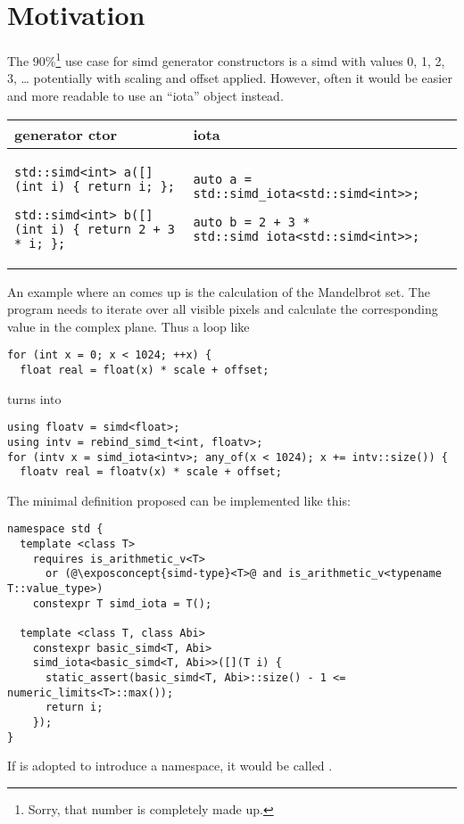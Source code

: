 \section{Motivation}
The 90\%\footnote{Sorry, that number is completely made up.} use case for simd
generator constructors is a simd with values 0, 1, 2, 3, \ldots{} potentially
with scaling and offset applied.
However, often it would be easier and more readable to use an “iota”
 object instead.

\begingroup
  \smaller[1]
\begin{tabular}{p{}|p{}}
  generator ctor & iota \\
  \hline
  \begin{lstlisting}
std::simd<int> a([](int i) { return i; };

std::simd<int> b([](int i) { return 2 + 3 * i; };
  \end{lstlisting}
  &
  \begin{lstlisting}
auto a = std::simd_iota<std::simd<int>>;

auto b = 2 + 3 * std::simd_iota<std::simd<int>>;
  \end{lstlisting}
\end{tabular}
\endgroup

\pagebreak
An example where an  comes up is the calculation of the
Mandelbrot set.
The program needs to iterate over all visible pixels and calculate the
corresponding value in the complex plane.
Thus a loop like
\medskip\begin{lstlisting}[style=Vc]
for (int x = 0; x < 1024; ++x) {
  float real = float(x) * scale + offset;
\end{lstlisting}
turns into
\medskip\begin{lstlisting}[style=Vc]
using floatv = simd<float>;
using intv = rebind_simd_t<int, floatv>;
for (intv x = simd_iota<intv>; any_of(x < 1024); x += intv::size()) {
  floatv real = floatv(x) * scale + offset;
\end{lstlisting}

The minimal definition proposed can be implemented like this:
\medskip\begin{lstlisting}[style=Vc]
namespace std {
  template <class T>
    requires is_arithmetic_v<T>
      or (@\exposconcept{simd-type}<T>@ and is_arithmetic_v<typename T::value_type>)
    constexpr T simd_iota = T();

  template <class T, class Abi>
    constexpr basic_simd<T, Abi>
    simd_iota<basic_simd<T, Abi>>([](T i) {
      static_assert(basic_simd<T, Abi>::size() - 1 <= numeric_limits<T>::max());
      return i;
    });
}
\end{lstlisting}

If  is adopted to introduce a \std{} namespace, it would
be called \stdsimd{}.

